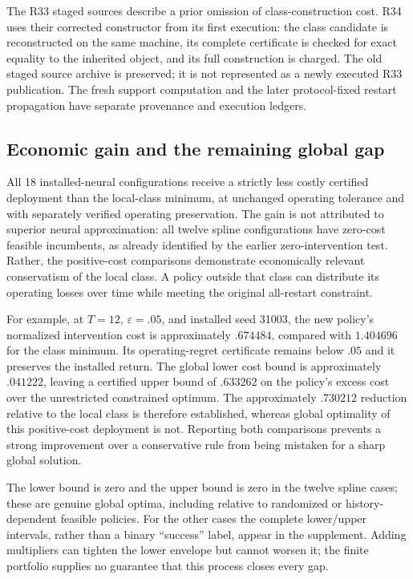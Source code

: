 The R33 staged sources describe a prior omission of class-construction cost. R34 uses their corrected constructor from its first execution: the class candidate is reconstructed on the same machine, its complete certificate is checked for exact equality to the inherited object, and its full construction is charged. The old staged source archive is preserved; it is not represented as a newly executed R33 publication. The fresh support computation and the later protocol-fixed restart propagation have separate provenance and execution ledgers.

\subsection{Economic gain and the remaining global gap}

All 18 installed-neural configurations receive a strictly less costly certified deployment than the local-class minimum, at unchanged operating tolerance and with separately verified operating preservation. The gain is not attributed to superior neural approximation: all twelve spline configurations have zero-cost feasible incumbents, as already identified by the earlier zero-intervention test. Rather, the positive-cost comparisons demonstrate economically relevant conservatism of the local class. A policy outside that class can distribute its operating losses over time while meeting the original all-restart constraint.

For example, at $T=12$, $\varepsilon=.05$, and installed seed 31003, the new policy's normalized intervention cost is approximately $.674484$, compared with $1.404696$ for the class minimum. Its operating-regret certificate remains below $.05$ and it preserves the installed return. The global lower cost bound is approximately $.041222$, leaving a certified upper bound of $.633262$ on the policy's excess cost over the unrestricted constrained optimum. The approximately $.730212$ reduction relative to the local class is therefore established, whereas global optimality of this positive-cost deployment is not. Reporting both comparisons prevents a strong improvement over a conservative rule from being mistaken for a sharp global solution.

The lower bound is zero and the upper bound is zero in the twelve spline cases; these are genuine global optima, including relative to randomized or history-dependent feasible policies. For the other cases the complete lower/upper intervals, rather than a binary ``success'' label, appear in the supplement. Adding multipliers can tighten the lower envelope but cannot worsen it; the finite portfolio supplies no guarantee that this process closes every gap.

